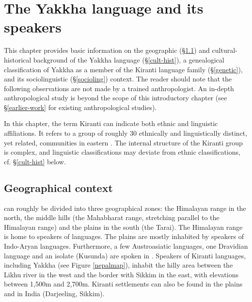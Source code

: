 ﻿\chapter{The Yakkha language and its speakers}\label{languageintro}
This chapter provides basic information on the geographic (§\ref{geogr}) and cultural-historical  background of the Yakkha language (§\ref{cult-hist}), a genealogical classification of Yakkha as a member of the Kiranti language family (§\ref{genetic}), and its sociolinguistic (§\ref{socioling}) context. The reader should note that the  following observations are not made by a trained anthropologist. An in-depth anthropological study is beyond the scope of this introductory chapter (see §\ref{earlier-work} for existing anthropological studies). 

In this chapter, the term  Kiranti can indicate both ethnic and linguistic affiliations. It refers to a group of roughly 30 ethnically and linguistically distinct, yet related, communities in eastern . The internal structure of the Kiranti group is complex, and linguistic classifications may deviate from ethnic classifications, cf. §\ref{cult-hist} below.

\section{Geographical context}\label{geogr}

 can roughly be divided into three geographical zones: the Himalayan range in the north, the middle hills (the Mahabharat range, stretching parallel to the Himalayan range) and the plains in the south (the Tarai). The Himalayan range is home to speakers of  languages. The plains are mostly inhabited by speakers of Indo-Aryan languages. Furthermore, a few Austroasiatic languages, one Dravidian language and an isolate (Kusunda) are spoken in . Speakers of Kiranti languages, including Yakkha (see Figure \ref{nepalmap}), inhabit the hilly area between the Likhu river in the west and the border with Sikkim in the east, with elevations between 1,500m and 2,700m. Kiranti  settlements can also be found in the plains and in India (Darjeeling, Sikkim). 

